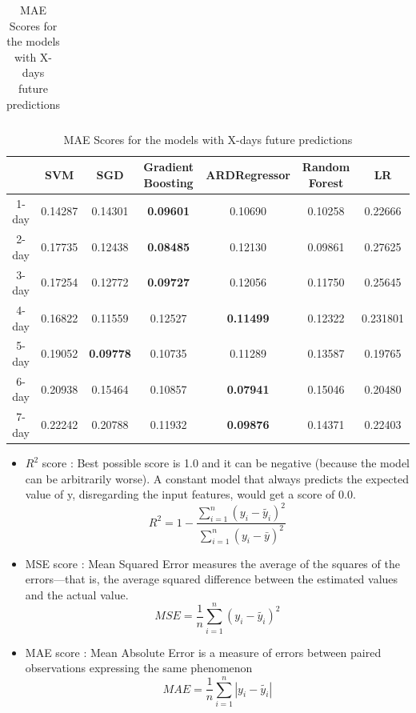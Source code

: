 \documentclass[12pt,a4paper]{article}
\begin{document}
\begin{table}[htb]
\begin{tabular}{ |c|c|c|c|c|c|c| }
        \hline 
        \end{tabular}
        \caption{MSE Scores for the models with X-days future predictions}
    \begin{tabular}{ |c|c|c|c|c|c|c| }
        \hline
        & SVM & SGD & Gradient Boosting & ARDRegressor & Random Forest & LR \\
        \hline
        1-day & 0.14287 & 0.14301 & \textbf{0.09601} & 0.10690 & 0.10258 & 0.22666 \\
        \hline
        2-day & 0.17735 & 0.12438 & \textbf{0.08485} & 0.12130 & 0.09861 & 0.27625 \\
        \hline
        3-day & 0.17254 & 0.12772 & \textbf{0.09727} & 0.12056 & 0.11750 & 0.25645  \\
        \hline
        4-day & 0.16822 & 0.11559 & 0.12527 & \textbf{0.11499} & 0.12322 & 0.231801 \\
        \hline
        5-day & 0.19052 & \textbf{0.09778} & 0.10735 & 0.11289 & 0.13587 & 0.19765 \\
        \hline
        6-day & 0.20938 & 0.15464 & 0.10857 & \textbf{0.07941} & 0.15046 & 0.20480 \\
        \hline
        7-day & 0.22242 & 0.20788 & 0.11932 & \textbf{0.09876} & 0.14371 & 0.22403 \\
        \hline 
        \end{tabular}
        \caption{MAE Scores for the models with X-days future predictions}
\end{table}
\newpage
\begin{itemize}
    \item $R^2$ score : Best possible score is 1.0 and it can be negative (because the model can be arbitrarily worse). A constant model that always predicts the expected value of y, disregarding the input features, would get a score of 0.0.
        \begin{equation}
            R^2 = 1 - \frac{\sum_{i=1}^{n}(y_i - \tilde{y_i})^2}{\sum_{i=1}^{n}(y_i - \bar{y})^2} 
        \end{equation}
    \item MSE score : Mean Squared Error measures the average of the squares of the errors—that is, the average squared difference between the estimated values and the actual value. 
        \begin{equation}
            MSE = \frac{1}{n}\sum_{i=1}^{n}(y_i - \tilde{y_i})^2
        \end{equation}
    \item MAE score : Mean Absolute Error is a measure of errors between paired observations expressing the same phenomenon
    \begin{equation}
        MAE = \frac{1}{n}\sum_{i=1}^{n}|y_i - \tilde{y_i}|
    \end{equation}
\end{itemize}
\end{document}
